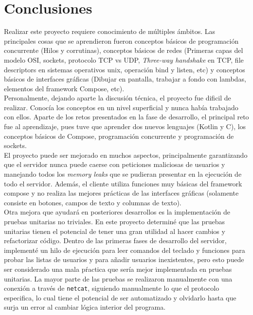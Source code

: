 \documentclass[12pt,a4paper]{article}
\begin{document}
\section{Conclusiones}
Realizar este proyecto requiere conocimiento de múltiples ámbitos. Las principales cosas que se aprendieron fueron conceptos básicos de programación concurrente (Hilos y corrutinas), conceptos básicos de redes (Primeras capas del modelo OSI, sockets, protocolo TCP vs UDP, \textit{Three-way handshake} en TCP, file descriptors en sistemas operativos unix, operación bind y listen, etc) y conceptos básicos de interfaces gráficas (Dibujar en pantalla, trabajar a fondo con lambdas, elementos del framework Compose, etc). \\
Personalmente, dejando aparte la discusión técnica, el proyecto fue dificil de realizar. Conocía los conceptos en un nivel superficial y nunca había trabajado con ellos. Aparte de los retos presentados en la fase de desarrollo, el principal reto fue al aprendizaje, pues tuve que aprender dos nuevos lenguajes (Kotlin y C), los conceptos básicos de Compose, programación concurrente y programación de sockets. \\
El proyecto puede ser mejorado en muchos aspectos, principalmente garantizando que el servidor nunca puede caerse con peticiones maliciosas de usuarios y manejando todos los \textit{memory leaks} que se pudieran presentar en la ejecución de todo el servidor. Además, el cliente utiliza funciones muy básicas del framework compose y no realiza las mejores prácticas de las interfaces gráficas (solamente consiste en botones, campos de texto y columnas de texto). \\
Otra mejora que ayudará en posteriores desarrollos es la implementación de pruebas unitarias no triviales. En este proyecto determiné que las pruebas unitarias tienen el potencial de tener una gran utilidad al hacer cambios y refactorizar código. Dentro de las primeras fases de desarrollo del servidor, implementé un hilo de ejecución para leer comandos del teclado y funciones para probar las listas de usuarios y para añadir usuarios inexistentes, pero esto puede ser considerado una mala pŕactica que sería mejor implementada en pruebas unitarias. La mayor parte de las pruebas se realizaron manualmente con una conexión a través de \texttt{netcat}, siguiendo manualmente lo que el protocolo especifica, lo cual tiene el potencial de ser automatizado y olvidarlo hasta que surja un error al cambiar lógica interior del programa.
\end{document}
